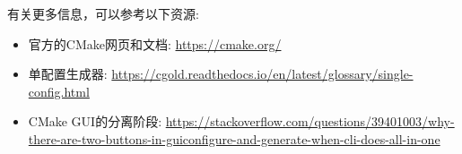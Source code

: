 

有关更多信息，可以参考以下资源:

\begin{itemize}
\item 
官方的CMake网页和文档: \url{https://cmake.org/}

\item 
单配置生成器: \url{https://cgold.readthedocs.io/en/latest/glossary/single-config.html}

\item 
CMake GUI的分离阶段: \url{https://stackoverflow.com/questions/39401003/why-there-are-two-buttons-in-guiconfigure-and-generate-when-cli-does-all-in-one}
\end{itemize}